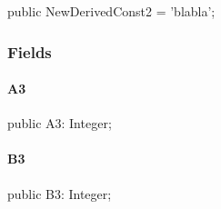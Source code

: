 \documentclass{report}
\begin{document}
\begin{list}{}{
\setlength{\itemindent}{0cm}
\setlength{\listparindent}{0cm}
\setlength{\leftmargin}{\evensidemargin}
\addtolength{\leftmargin}{\tmplength}
\settowidth{\labelsep}{X}
\addtolength{\leftmargin}{\labelsep}
\setlength{\labelwidth}{\tmplength}
}
\begin{flushleft}
\item[\textbf{Declaration}\hfill]
\begin{ttfamily}
public NewDerivedConst2 = 'blabla';\end{ttfamily}


\end{flushleft}
\end{list}
\subsubsection*{\large{\textbf{Fields}}\normalsize\hspace{1ex}\hfill}
\paragraph*{A3}\hspace*{\fill}

\begin{list}{}{
\setlength{\itemindent}{0cm}
\setlength{\listparindent}{0cm}
\setlength{\leftmargin}{\evensidemargin}
\addtolength{\leftmargin}{\tmplength}
\settowidth{\labelsep}{X}
\addtolength{\leftmargin}{\labelsep}
\setlength{\labelwidth}{\tmplength}
}
\begin{flushleft}
\item[\textbf{Declaration}\hfill]
\begin{ttfamily}
public A3: Integer;\end{ttfamily}


\end{flushleft}
\end{list}
\paragraph*{B3}\hspace*{\fill}

\begin{list}{}{
\setlength{\itemindent}{0cm}
\setlength{\listparindent}{0cm}
\setlength{\leftmargin}{\evensidemargin}
\addtolength{\leftmargin}{\tmplength}
\settowidth{\labelsep}{X}
\addtolength{\leftmargin}{\labelsep}
\setlength{\labelwidth}{\tmplength}
}
\begin{flushleft}
\item[\textbf{Declaration}\hfill]
\begin{ttfamily}
public B3: Integer;\end{ttfamily}


\end{flushleft}
\end{list}
\end{document}
